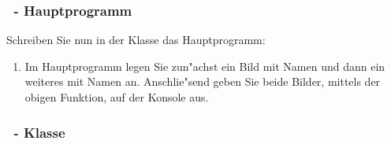 \begin{frame}%
  \frametitle{\theexercise\ - Hauptprogramm}%

Schreiben Sie nun in der Klasse  das Hauptprogramm:
\begin{enumerate}
\item Im Hauptprogramm legen Sie zun"achst ein Bild mit Namen  und dann ein weiteres mit Namen  an.
  Anschlie"send geben Sie beide Bilder, mittels der \mbox{obigen}  Funktion, auf der Konsole aus.
\end{enumerate}
\pause
  \frametitle{\theexercise\ - Klasse  }%
%
\end{frame}
